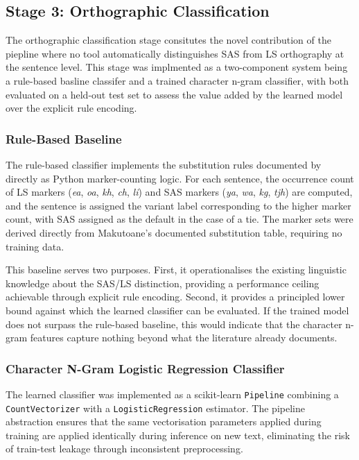 \documentclass[11pt,a4paper]{article}
\begin{document}
\subsection{Stage 3: Orthographic Classification}
The orthographic classification stage consitutes the novel contribution of the piepline where no tool automatically distinguishes SAS from LS orthography at the sentence level. This stage was implmented as a two-component system being a rule-based basline classifer and a trained character n-gram classifier, with both evaluated on a held-out test set to assess the value added by the learned model over the explicit rule encoding.

\subsubsection{Rule-Based Baseline}
\label{sec:rulebased}

The rule-based classifier implements the substitution rules documented by \citet{makutoane2022people} directly as Python
marker-counting logic. For each sentence, the occurrence count of LS
markers (\textit{ea}, \textit{oa}, \textit{kh}, \textit{ch},
\textit{li}) and SAS markers (\textit{ya}, \textit{wa},
\textit{kg}, \textit{tjh}) are computed, and the sentence is
assigned the variant label corresponding to the higher marker count,
with SAS assigned as the default in the case of a tie. The marker
sets were derived directly from Makutoane's documented substitution
table, requiring no training data.

This baseline serves two purposes. First, it operationalises the
existing linguistic knowledge about the SAS/LS distinction,
providing a performance ceiling achievable through explicit rule
encoding. Second, it provides a principled lower bound against which
the learned classifier can be evaluated. If the trained model does
not surpass the rule-based baseline, this would indicate that the
character n-gram features capture nothing beyond what the literature
already documents.

\subsubsection{Character N-Gram Logistic Regression Classifier}
\label{sec:learned}

The learned classifier was implemented as a scikit-learn
\texttt{Pipeline} combining a \texttt{CountVectorizer} with a
\texttt{LogisticRegression} estimator. The pipeline abstraction
ensures that the same vectorisation parameters applied during training
are applied identically during inference on new text, eliminating
the risk of train-test leakage through inconsistent preprocessing.
\end{document}
